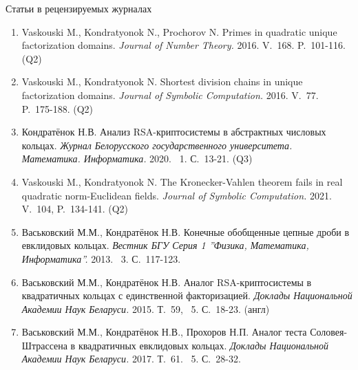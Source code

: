 \documentclass[8pt, xcolor=x11names]{beamer}
\begin{document}
\begin{frame}{Статьи в рецензируемых журналах}
    \begin{enumerate}
        \item Vaskouski M., Kondratyonok N., Prochorov N. Primes in quadratic unique factorization domains. {\it Journal of Number Theory.} 2016. V.~168. P.~101-116. (Q2)
        
        \item Vaskouski M., Kondratyonok N. Shortest division chains in unique factorization domains. {\it Journal of Symbolic Computation.} 2016. V.~77. P.~175-188. (Q2)
        
        \item Кондратёнок Н.В. Анализ RSA-криптосистемы в абстрактных числовых кольцах. {\it Журнал Белорусского государственного университета. Математика. Информатика.} 2020. \textnumero~1. С.~13-21. (Q3)

        \item Vaskouski M., Kondratyonok N. The Kronecker-Vahlen theorem fails in real quadratic norm-Euclidean fields. {\it Journal of Symbolic Computation.} 2021. V.~104, P.~134-141. (Q2)

        \item Васьковский М.М., Кондратёнок Н.В. Конечные обобщенные цепные дроби в евклидовых кольцах. {\it Вестник БГУ Серия 1 ''Физика, Математика, Информатика''.} 2013. \textnumero~3. С.~117-123.
        
        \item Васьковский М.М., Кондратёнок Н.В. Аналог RSA-криптосистемы в квадратичных кольцах с единственной факторизацией. {\it Доклады Национальной Академии Наук Беларуси.} 2015. Т.~59, \textnumero~5. С.~18-23. (англ)

        \item Васьковский М.М., Кондратёнок Н.В., Прохоров Н.П. Аналог теста Соловея-Штрассена в квадратичных евклидовых кольцах. {\it Доклады Национальной Академии Наук Беларуси.} 2017. Т.~61. \textnumero~5. С.~28-32.
    \end{enumerate}
\end{frame}
\end{document}
